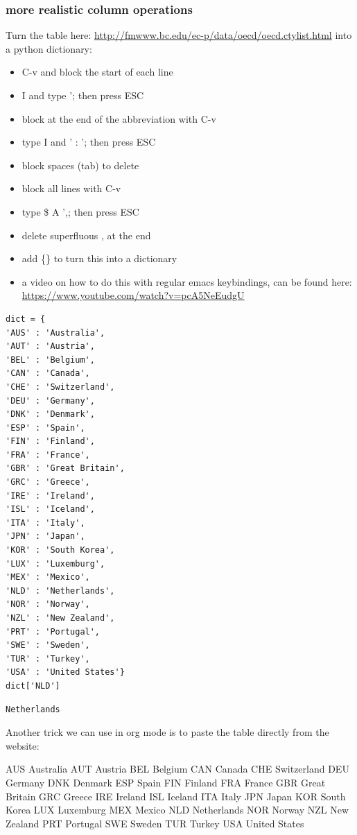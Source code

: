 \documentclass[11pt]{article}
\begin{document}
\subsubsection{more realistic column operations}
\label{sec:org451c284}

Turn the table here: \url{http://fmwww.bc.edu/ec-p/data/oecd/oecd.ctylist.html} into a python dictionary:
\begin{itemize}
\item C-v and block the start of each line
\item I and type '; then press ESC
\item block at the end of the abbreviation with C-v
\item type I and ' : '; then press ESC
\item block spaces (tab) to delete
\item block all lines with C-v
\item type \$ A ',; then press ESC
\item delete superfluous , at the end
\item add \{\} to turn this into a dictionary
\item a video on how to do this with regular emacs keybindings, can be found here: \url{https://www.youtube.com/watch?v=pcA5NeEudgU}
\end{itemize}

\begin{verbatim}
dict = {
'AUS' : 'Australia',
'AUT' : 'Austria',
'BEL' : 'Belgium',
'CAN' : 'Canada',
'CHE' : 'Switzerland',
'DEU' : 'Germany',
'DNK' : 'Denmark',
'ESP' : 'Spain',
'FIN' : 'Finland',
'FRA' : 'France',
'GBR' : 'Great Britain',
'GRC' : 'Greece',
'IRE' : 'Ireland',
'ISL' : 'Iceland',
'ITA' : 'Italy',
'JPN' : 'Japan',
'KOR' : 'South Korea',
'LUX' : 'Luxemburg',
'MEX' : 'Mexico',
'NLD' : 'Netherlands',
'NOR' : 'Norway',
'NZL' : 'New Zealand',
'PRT' : 'Portugal',
'SWE' : 'Sweden',
'TUR' : 'Turkey',
'USA' : 'United States'}
dict['NLD']
\end{verbatim}

\begin{verbatim}
Netherlands
\end{verbatim}


Another trick we can use in org mode is to paste the table directly from the website:

AUS 	Australia
AUT 	Austria
BEL 	Belgium
CAN 	Canada
CHE 	Switzerland
DEU 	Germany
DNK 	Denmark
ESP 	Spain
FIN 	Finland
FRA 	France
GBR 	Great Britain
GRC 	Greece
IRE 	Ireland
ISL 	Iceland
ITA 	Italy
JPN 	Japan
KOR 	South Korea
LUX 	Luxemburg
MEX 	Mexico
NLD 	Netherlands
NOR 	Norway
NZL 	New Zealand
PRT 	Portugal
SWE 	Sweden
TUR 	Turkey
USA 	United States
\end{document}
